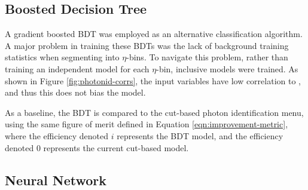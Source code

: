 \subsection{Boosted Decision Tree}

A gradient boosted \gls{BDT} was employed as an alternative classification algorithm. A major problem in training these \glspl{BDT} was the lack of background training statistics when segmenting into $\eta$-\pt bins. To navigate this problem, rather than training an independent model for each $\eta$-\pt bin, \pt inclusive models were trained. As shown in Figure \ref{fig:photonid-corrs}, the input variables have low correlation to \pt, and thus this does not bias the model.




As a baseline, the \gls{BDT} is compared to the cut-based photon identification menu, using the same figure of merit defined in Equation \ref{eqn:improvement-metric}, where the efficiency denoted $i$ represents the \gls{BDT} model, and the efficiency denoted $0$ represents the current cut-based model.


\subsection{Neural Network}